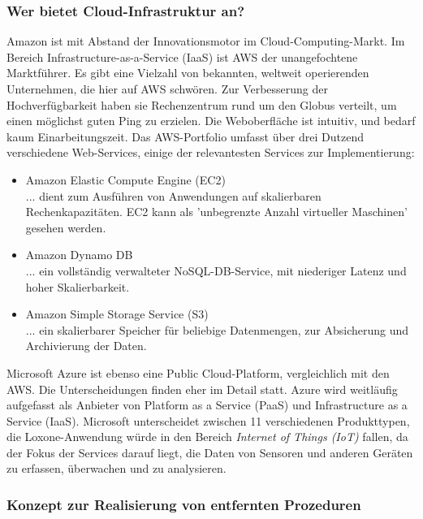 \documentclass[letterpaper, 12pt]{article}
\let\tempsubsubsection\subsubsection
\renewcommand\subsubsection[1]{\vspace{0cm}\tempsubsubsection{#1}\vspace{0cm}}
\begin{document}
\subsubsection{Wer bietet Cloud-Infrastruktur an?}


Amazon ist mit Abstand der Innovationsmotor im Cloud-Computing-Markt. Im Bereich Infrastructure-as-a-Service (IaaS) ist AWS der unangefochtene Marktführer. Es gibt eine Vielzahl von bekannten, weltweit operierenden Unternehmen, die hier auf AWS schwören. Zur Verbesserung der Hochverfügbarkeit haben sie Rechenzentrum rund um den Globus verteilt, um einen möglichst guten Ping zu erzielen. Die Weboberfläche ist intuitiv, und bedarf kaum Einarbeitungszeit. Das AWS-Portfolio umfasst über drei Dutzend verschiedene Web-Services, einige der relevantesten Services zur Implementierung:

\begin{itemize}
	\item Amazon Elastic Compute Engine (EC2) \\
		... dient zum Ausführen von Anwendungen auf skalierbaren Rechenkapazitäten. EC2 kann als 'unbegrenzte Anzahl virtueller Maschinen' gesehen werden. 
	\clearpage
	\item Amazon Dynamo DB \\
	... ein vollständig verwalteter NoSQL-DB-Service, mit niederiger Latenz und hoher Skalierbarkeit.
	\item Amazon Simple Storage Service (S3) \\
	... ein skalierbarer Speicher für beliebige Datenmengen, zur Absicherung und Archivierung der Daten. \cite{aws}
\end{itemize}


Microsoft Azure ist ebenso eine Public Cloud-Platform, vergleichlich mit den AWS. Die Unterscheidungen finden eher im Detail statt. Azure wird weitläufig aufgefasst als Anbieter von Platform as a Service (PaaS) und Infrastructure as a Service (IaaS). Microsoft unterscheidet zwischen 11 verschiedenen Produkttypen, die Loxone-Anwendung würde in den Bereich \textit{Internet of Things (IoT)} fallen, da der Fokus der Services darauf liegt, die Daten von Sensoren und anderen Geräten zu erfassen, überwachen und zu analysieren. \cite{azure}

\subsubsection{Konzept zur Realisierung von entfernten Prozeduren}
\end{document}
